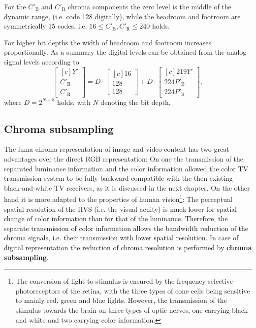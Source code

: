 For the $C'_\mathrm{B}$ and $C'_\mathrm{R}$ chroma components the zero level is the middle of the dynamic range, (i.e. code 128 digitally), while the headroom and footroom are symmetrically 15 codes, i.e. $16 \leq C'_\mathrm{B}, C'_\mathrm{R} \leq 240$ holds.

For higher bit depths the width of headroom and footroom increases proportionally.
As a summary the \ycbcr digital levels can be obtained from the \ypbpr analog signal levels according to
\begin{equation}
\begin{bmatrix}[c]
       Y' \\[0.3em]
       C'_{\mathrm{B}} \\[0.3em]
       C'_{\mathrm{R}} \end{bmatrix}
       =
D\cdot
\begin{bmatrix}[c]
       16 \\[0.3em]
       128 \\[0.3em]
       128 \end{bmatrix}
+
D\cdot
\begin{bmatrix}[c]
       219 Y' \\[0.3em]
       224 P'_\mathrm{B} \\[0.3em]
       224 P'_{\mathrm{R}} \end{bmatrix},
\end{equation}
where $D = 2^{N-8}$ holds, with $N$ denoting the bit depth.

\subsection{Chroma subsampling}
%
The luma-chroma representation of image and video content has two great advantages over the direct RGB representation:
On one the transmission of the separated luminance information and the color information allowed the color TV transmission system to be fully backward compatible with the then-existing black-and-white TV receivers, as it is discussed in the next chapter.
On the other hand it is more adapted to the properties of human vision\footnote{
The conversion of light to stimulus is ensured by the frequency-selective photoreceptors of the retina, with the three types of cone cells being sensitive to mainly red, green and blue lights.
However, the transmission of the stimulus towards the brain on three types of optic nerves, one carrying black and white and two carrying color information.}: 
The perceptual spatial resolution of the HVS (i.e. the visual acuity) is much lower for spatial change of color information than for that of the luminance.
Therefore, the separate transmission of color information allows the bandwidth reduction of the chroma signals, i.e. their transmission with lower spatial resolution.
In case of digital representation the reduction of chroma resolution is performed by \textbf{chroma subsampling}.


